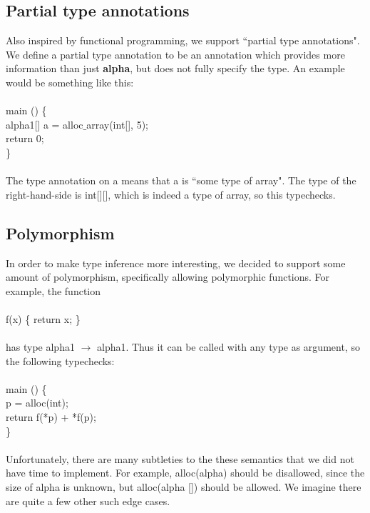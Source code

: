 \documentclass{article}
\begin{document}
\subsection{Partial type annotations}
Also inspired by functional programming, we support ``partial type annotations". We define a partial type annotation to be an annotation which provides more information than just \textbf{alpha}, but does not fully specify the type. An example would be something like this:\\
\\
main () \{\\
alpha1[] a = alloc$\_$array(int[], 5);\\
return 0;\\
\}\\
\\
The type annotation on a means that a is ``some type of array". The type of the right-hand-side is int[][], which is indeed a type of array, so this typechecks.\\

\subsection{Polymorphism}
In order to make type inference more interesting, we decided to support some amount of polymorphism, specifically allowing polymorphic functions. For example, the function\\
\\
f(x) \{ return x; \}\\
\\
has type alpha1 $\to$ alpha1. Thus it can be called with any type as argument, so the following typechecks:\\
\\
main () \{\\
p = alloc(int);\\
return f(*p) + *f(p);\\
\}\\
\\
Unfortunately, there are many subtleties to the these semantics that we did not have time to
implement. For example, alloc(alpha) should be disallowed, since the size of alpha is unknown, but alloc(alpha []) should be allowed. We imagine there are quite a few other such edge cases.
\end{document}
